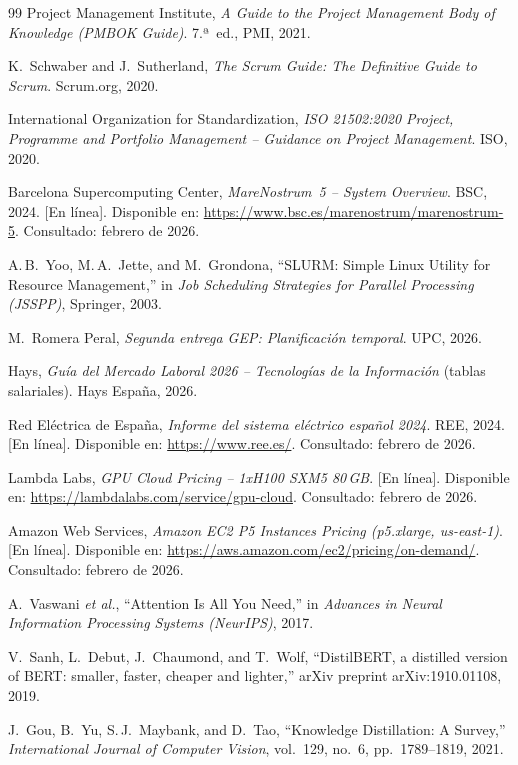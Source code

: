 \begin{thebibliography}{99}
Project Management Institute, \textit{A Guide to the Project Management Body of Knowledge (PMBOK Guide)}. 7.ª~ed., PMI, 2021.

K.~Schwaber and J.~Sutherland, \textit{The Scrum Guide: The Definitive Guide to Scrum}. Scrum.org, 2020.

International Organization for Standardization, \textit{ISO 21502:2020 Project, Programme and Portfolio Management -- Guidance on Project Management}. ISO, 2020.

Barcelona Supercomputing Center, \textit{MareNostrum~5 -- System Overview}. BSC, 2024. [En línea]. Disponible en: \url{https://www.bsc.es/marenostrum/marenostrum-5}. Consultado: febrero de 2026.

A.\,B.~Yoo, M.\,A.~Jette, and M.~Grondona, ``SLURM: Simple Linux Utility for Resource Management,'' in \textit{Job Scheduling Strategies for Parallel Processing (JSSPP)}, Springer, 2003.

M.~Romera Peral, \textit{Segunda entrega GEP: Planificación temporal}. UPC, 2026.

Hays, \textit{Guía del Mercado Laboral 2026 -- Tecnologías de la Información} (tablas salariales). Hays España, 2026.

Red Eléctrica de España, \textit{Informe del sistema eléctrico español 2024}. REE, 2024. [En línea]. Disponible en: \url{https://www.ree.es/}. Consultado: febrero de 2026.

Lambda Labs, \textit{GPU Cloud Pricing -- 1xH100 SXM5 80\,GB}. [En línea]. Disponible en: \url{https://lambdalabs.com/service/gpu-cloud}. Consultado: febrero de 2026.

Amazon Web Services, \textit{Amazon EC2 P5 Instances Pricing (p5.xlarge, us-east-1)}. [En línea]. Disponible en: \url{https://aws.amazon.com/ec2/pricing/on-demand/}. Consultado: febrero de 2026.

A.~Vaswani \textit{et al.}, ``Attention Is All You Need,'' in \textit{Advances in Neural Information Processing Systems (NeurIPS)}, 2017.

V.~Sanh, L.~Debut, J.~Chaumond, and T.~Wolf, ``DistilBERT, a distilled version of BERT: smaller, faster, cheaper and lighter,'' arXiv preprint arXiv:1910.01108, 2019.

J.~Gou, B.~Yu, S.\,J.~Maybank, and D.~Tao, ``Knowledge Distillation: A Survey,'' \textit{International Journal of Computer Vision}, vol.~129, no.~6, pp.~1789--1819, 2021.


\end{thebibliography}
